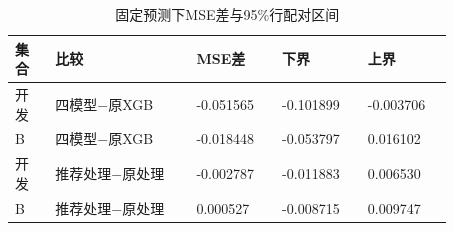 \begin{table}[htbp]
\small
\setlength{\tabcolsep}{5pt}
\centering
\caption{固定预测下MSE差与95\%行配对区间}
\label{tab:intervals}
\begin{tabular}{L{0.08\linewidth}L{0.28\linewidth}L{0.17\linewidth}L{0.17\linewidth}L{0.17\linewidth}}
\toprule
集合 & 比较 & MSE差 & 下界 & 上界 \\
\midrule
开发 & 四模型−原XGB & -0.051565 & -0.101899 & -0.003706 \\
B & 四模型−原XGB & -0.018448 & -0.053797 & 0.016102 \\
开发 & 推荐处理−原处理 & -0.002787 & -0.011883 & 0.006530 \\
B & 推荐处理−原处理 & 0.000527 & -0.008715 & 0.009747 \\
\bottomrule
\end{tabular}
\end{table}
